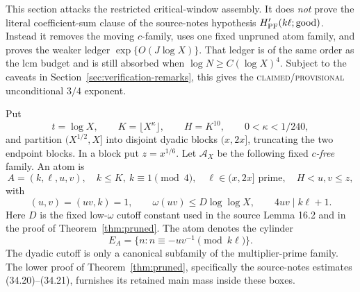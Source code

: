 \documentclass[10pt,reqno]{amsart}
\theoremstyle{definition}
\newcommand{\1}{\mathbf 1}
\begin{document}
This section attacks the restricted critical-window assembly.  It does
\emph{not} prove the literal coefficient-sum clause of the source-notes
hypothesis $H_{\rm PF}'(k\ell;{\rm good})$.  Instead it removes the moving
$c$-family, uses one fixed unpruned atom family, and proves the weaker ledger
$\exp\{O(J\log X)\}$.  That ledger is of the same order as the lcm budget and
is still absorbed when $\log N\geq C(\log X)^4$.  Subject to the caveats in
Section~\ref{sec:verification-remarks}, this gives the
\textsc{claimed/provisional} unconditional $3/4$ exponent.

Put
\begin{equation}\tag{39.1}
 t=\log X,\qquad K=\lfloor X^\kappa\rfloor,
 \qquad H=K^{10},\qquad 0<\kappa<1/240,
\end{equation}
and partition $(X^{1/2},X]$ into disjoint dyadic blocks $(x,2x]$, truncating
the two endpoint blocks.  In a block put $z=x^{1/6}$.  Let $\mathcal A_X$
be the following fixed \emph{$c$-free} family.  An atom is
\begin{equation}\tag{39.2}
 A=(k,\ell,u,v),\quad k\leq K,\ k\equiv1\pmod4,
 \quad \ell\in(x,2x]\text{ prime},\quad H<u,v\leq z,
\end{equation}
with
\begin{equation}\tag{39.3}
 (u,v)=(uv,k)=1,\qquad
 \omega(uv)\leq D\log\log X,\qquad 4uv\mid k\ell+1.
\end{equation}
Here $D$ is the fixed low-$\omega$ cutoff constant used in the source Lemma
16.2 and in the proof of Theorem~\ref{thm:pruned}.  The atom denotes the
cylinder
\begin{equation}\tag{39.4}
 E_A=\{n:n\equiv-uv^{-1}\pmod{k\ell}\}.
\end{equation}
The dyadic cutoff is only a canonical subfamily of the multiplier-prime
family.  The lower proof of Theorem~\ref{thm:pruned}, specifically the
source-notes estimates (34.20)--(34.21), furnishes its retained main mass
inside these boxes.
\end{document}
